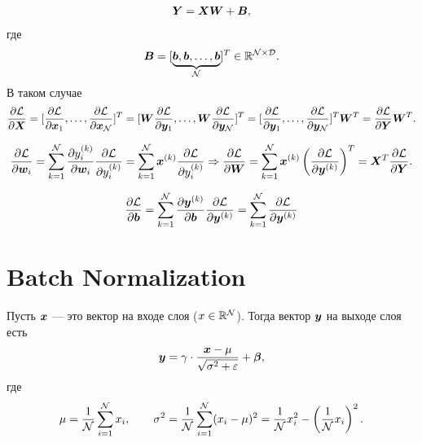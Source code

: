 \documentclass{report}
\numberwithin{theorem}{chapter}
\numberwithin{statement}{chapter}
\numberwithin{lemma}{chapter}
\theoremstyle{definition}
\numberwithin{task}{chapter}
\theoremstyle{remark}
\numberwithin{example}{chapter}
\theoremstyle{definition}
\numberwithin{definition}{chapter}
\theoremstyle{remark}
\theoremstyle{remark}
\numberwithin{lyrics}{section}
\begin{document}
\begin{gather*}
\boldsymbol{Y} = \boldsymbol{X} \boldsymbol{W} + \boldsymbol{B}, 
\end{gather*}
где 
$$\boldsymbol{B} = [\underbrace{\boldsymbol{b}, \boldsymbol{b}, \dots, \boldsymbol{b}}_{\mathcal{N}}]^T \in \mathbb{R}^{\mathcal{N} \times \mathcal{D}}.$$
В таком случае 
\begin{gather*}
\frac{\partial \mathcal{L} }{\partial \boldsymbol{X}} = [\frac{\partial \mathcal{L} }{\partial \boldsymbol{x}_1}, \dots, \frac{\partial \mathcal{L} }{\partial \boldsymbol{x}_{\mathcal{N}}}]^T = [\boldsymbol{W}  \frac{\partial \mathcal{L} }{\partial \boldsymbol{y}_1}, \dots,  \boldsymbol{W} \frac{\partial \mathcal{L} }{\partial \boldsymbol{y}_{\mathcal{N}}}]^T =  [\frac{\partial \mathcal{L} }{\partial \boldsymbol{y}_1}, \dots,  \frac{\partial \mathcal{L} }{\partial \boldsymbol{y}_{\mathcal{N}}}]^T \boldsymbol{W}^T =  \frac{\partial \mathcal{L} }{\partial \boldsymbol{Y}} \boldsymbol{W}^T.
\end{gather*}

\begin{gather*}
\frac{\partial \mathcal{L} }{\partial \boldsymbol{w}_i} = \sum\limits_{k=1}^{\mathcal{N}} \frac{\partial y_i^{(k)} }{\partial \boldsymbol{w}_i} \frac{\partial \mathcal{L} }{\partial y_i^{(k)}} = \sum\limits_{k=1}^{\mathcal{N}} \boldsymbol{x}^{(k)} \frac{\partial \mathcal{L} }{\partial y_i^{(k)}} \Rightarrow \frac{\partial \mathcal{L} }{\partial \boldsymbol{W}} = \sum\limits_{k=1}^{\mathcal{N}} \boldsymbol{x}^{(k)} \left(\frac{\partial \mathcal{L} }{\partial \boldsymbol{y}^{(k)}}\right)^T = \boldsymbol{X}^T \frac{\partial \mathcal{L} }{\partial \boldsymbol{Y}}.
\end{gather*}

\begin{gather*}
\frac{\partial \mathcal{L} }{\partial \boldsymbol{b}} = \sum\limits_{k=1}^{\mathcal{N}} \frac{\partial \boldsymbol{y}^{(k)} }{\partial \boldsymbol{b}} \frac{\partial \mathcal{L} }{\partial \boldsymbol{y}^{(k)}} = \sum\limits_{k=1}^{\mathcal{N}} \frac{\partial \mathcal{L} }{\partial \boldsymbol{y}^{(k)}}
\end{gather*}

\section{Batch Normalization}

Пусть $\boldsymbol{x}$ --- это вектор на входе слоя ($x \in \mathbb{R}^{\mathcal{N}}$). Тогда вектор $\boldsymbol{y}$ на выходе слоя есть
$$
\boldsymbol{y} = \gamma \cdot \frac{\boldsymbol{x} - \mu}{\sqrt{\sigma^2 + \varepsilon}} + \boldsymbol{\beta},
$$
где $$\mu = \frac{1}{\mathcal{N}}\sum\limits_{i=1}^{\mathcal{N}} x_i, \qquad \sigma^2 = \frac{1}{\mathcal{N}}\sum\limits_{i = 1}^{\mathcal{N}} (x_i - \mu)^2 = \frac{1}{\mathcal{N}} x_i^2 - \left(\frac{1}{\mathcal{N}} x_i \right)^2.$$
\end{document}
